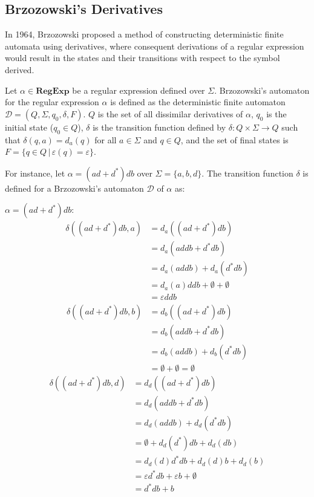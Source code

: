 \subsection{Brzozowski's Derivatives}
In 1964, Brzozowski \cite{brzozowski_derivatives} proposed a method of constructing deterministic finite automata using derivatives, where consequent derivations of a regular expression would result in the states and their transitions with respect to the symbol derived.

\begin{defn}
	Let $\alpha \in \textbf{RegExp}$ be a regular expression defined over $\Sigma$. Brzozowski's automaton for the regular expression $\alpha$ is defined as the deterministic finite automaton $\mathcal{D} = (Q, \Sigma, q_0, \delta, F)$. $Q$ is the set of all dissimilar derivatives of $\alpha$, $q_0$ is the initial state ($q_0 \in Q$), $\delta$ is the transition function defined by $\delta: Q \times \Sigma \rightarrow Q$ such that $\delta (q,a) = d_a(q)$ for all $a \in \Sigma$ and $q \in Q$, and the set of final states is $F = \{q \in Q \, | \, \varepsilon(q) = \varepsilon\}$.
\end{defn}

For instance, let $\alpha = (ad+d^*)db$ over $\Sigma = \{a,b,d\}$. The transition function $\delta$ is defined for a Brzozowski's automaton $\mathcal{D}$ of $\alpha$ as:

\medspace $\alpha = (ad+d^*)db$:
\begin{align*}
	\delta((ad + d^*)db, a) &= d_a((ad + d^*)db) \\
	&= d_a(addb + d^*db) \\
	&= d_a(addb) + d_a(d^*db) \\
	&= d_a(a)ddb + \emptyset + \emptyset \\
	&= \varepsilon ddb
\end{align*}
\begin{align*}
	\delta((ad + d^*)db, b) &= d_b((ad + d^*)db) \\
	&= d_b(addb + d^*db) \\
	&= d_b(addb) + d_b(d^*db) \\
	&= \emptyset + \emptyset = \emptyset
\end{align*}
\begin{align*}
	\delta((ad + d^*)db, d) &= d_d((ad + d^*)db) \\
	&= d_d(addb + d^*db) \\
	&= d_d(addb) + d_d(d^*db) \\
	&= \emptyset + d_d(d^*)db + d_d(db) \\
	&= d_d(d)d^*db + d_d(d)b + d_d(b) \\
	&= \varepsilon d^*db + \varepsilon b + \emptyset \\
	&= d^*db + b
\end{align*}

